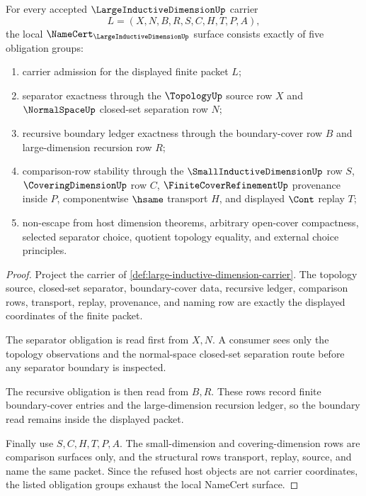 \begin{theorem}
\label{thm:large-inductive-dimension-namecert-obligations}
For every accepted $\LargeInductiveDimensionUp$ carrier
$$
L=(X,N,B,R,S,C,H,T,P,A),
$$
the local $\NameCert_{\LargeInductiveDimensionUp}$ surface consists exactly of five obligation groups:
\begin{enumerate}
\item carrier admission for the displayed finite packet $L$;
\item separator exactness through the $\TopologyUp$ source row $X$ and $\NormalSpaceUp$ closed-set separation row $N$;
\item recursive boundary ledger exactness through the boundary-cover row $B$ and large-dimension recursion row $R$;
\item comparison-row stability through the $\SmallInductiveDimensionUp$ row $S$, $\CoveringDimensionUp$ row $C$, $\FiniteCoverRefinementUp$ provenance inside $P$, componentwise $\hsame$ transport $H$, and displayed $\Cont$ replay $T$;
\item non-escape from host dimension theorems, arbitrary open-cover compactness, selected separator choice, quotient topology equality, and external choice principles.
\end{enumerate}
\end{theorem}
\begin{proof}
Project the carrier of \autoref{def:large-inductive-dimension-carrier}. The topology source, closed-set separator, boundary-cover data, recursive ledger, comparison rows, transport, replay, provenance, and naming row are exactly the displayed coordinates of the finite packet.

The separator obligation is read first from $X,N$. A consumer sees only the topology observations and the normal-space closed-set separation route before any separator boundary is inspected.

The recursive obligation is then read from $B,R$. These rows record finite boundary-cover entries and the large-dimension recursion ledger, so the boundary read remains inside the displayed packet.

Finally use $S,C,H,T,P,A$. The small-dimension and covering-dimension rows are comparison surfaces only, and the structural rows transport, replay, source, and name the same packet. Since the refused host objects are not carrier coordinates, the listed obligation groups exhaust the local NameCert surface.
\end{proof}

